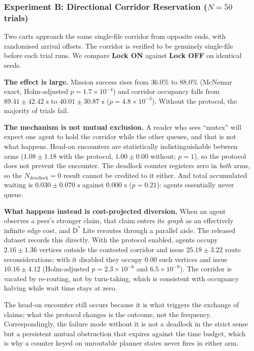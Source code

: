 \documentclass[journal]{IEEEtran}
\begin{document}
\subsubsection{Experiment B: Directional Corridor Reservation ($N=50$ trials)}
Two carts approach the same single-file corridor from opposite ends, with randomised arrival offsets. The corridor is verified to be genuinely single-file before each trial runs. We compare \textbf{Lock ON} against \textbf{Lock OFF} on identical seeds.



\textbf{The effect is large.} Mission success rises from $36.0\%$ to $88.0\%$ (McNemar exact, Holm-adjusted $p = 1.7 \times 10^{-4}$) and corridor occupancy falls from $89.41 \pm 42.42\text{ s}$ to $40.01 \pm 30.87\text{ s}$ ($p = 4.8 \times 10^{-3}$). Without the protocol, the majority of trials fail.

\textbf{The mechanism is not mutual exclusion.} A reader who sees ``mutex'' will expect one agent to hold the corridor while the other queues, and that is not what happens. Head-on encounters are statistically indistinguishable between arms ($1.08 \pm 1.18$ with the protocol, $1.00 \pm 0.00$ without; $p = 1$), so the protocol does not prevent the encounter. The deadlock counter registers zero in \emph{both} arms, so the $N_{\text{deadlock}} = 0$ result cannot be credited to it either. And total accumulated waiting is $0.030 \pm 0.070\text{ s}$ against $0.000\text{ s}$ ($p = 0.21$): agents essentially never queue.

\textbf{What happens instead is cost-projected diversion.} When an agent observes a peer's stronger claim, that claim enters its \emph{graph} as an effectively infinite edge cost, and $\text{D}^*$ Lite reroutes through a parallel aisle. The released dataset records this directly. With the protocol enabled, agents occupy $2.16 \pm 1.36$ vertices outside the contested corridor and issue $25.18 \pm 3.22$ route reconsiderations; with it disabled they occupy $0.00$ such vertices and issue $10.16 \pm 4.12$ (Holm-adjusted $p = 2.3 \times 10^{-8}$ and $6.5 \times 10^{-9}$). The corridor is vacated by re-routing, not by turn-taking, which is consistent with occupancy halving while wait time stays at zero.

The head-on encounter still occurs because it is what triggers the exchange of claims; what the protocol changes is the outcome, not the frequency. Correspondingly, the failure mode without it is not a deadlock in the strict sense but a persistent mutual obstruction that expires against the time budget, which is why a counter keyed on unroutable planner states never fires in either arm.
\end{document}
